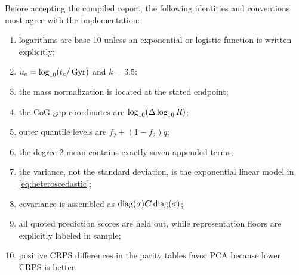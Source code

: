 Before accepting the compiled report, the following identities and conventions
must agree with the implementation:
\begin{enumerate}
  \item logarithms are base 10 unless an exponential or logistic function is
  written explicitly;
  \item $u_c=\log_{10}(t_c/\,\mathrm{Gyr})$ and $k=3.5$;
  \item the \diffmah{} mass normalization is located at the stated endpoint;
  \item the CoG gap coordinates are $\log_{10}(\Delta\log_{10} R)$;
  \item \ExpFiftyOne{} outer quantile levels are $f_2+(1-f_2)q$;
  \item the degree-2 mean contains exactly seven appended terms;
  \item the variance, not the standard deviation, is the exponential linear
  model in \cref{eq:heteroscedastic};
  \item covariance is assembled as $\operatorname{diag}(\sigma)\bm{C}
  \operatorname{diag}(\sigma)$;
  \item all quoted prediction scores are held out, while representation floors
  are explicitly labeled in sample;
  \item positive CRPS differences in the parity tables favor PCA because lower
  CRPS is better.
\end{enumerate}
